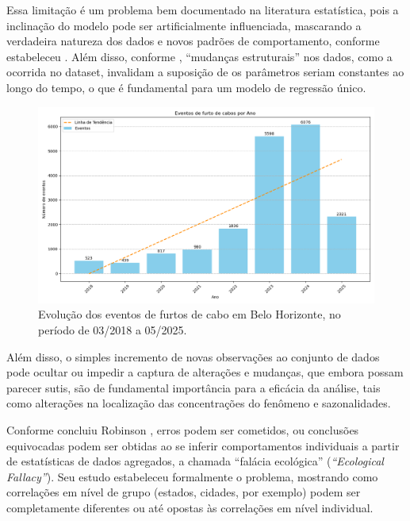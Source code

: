 Essa limitação é um problema bem documentado na literatura estatística, pois a inclinação do modelo pode ser artificialmente influenciada, mascarando a verdadeira natureza dos dados e novos padrões de comportamento, conforme estabeleceu \cite{Anscombe1973}. Além disso, conforme \cite{Gujarati2011}, ``mudanças estruturais'' nos dados, como a ocorrida no dataset, invalidam a suposição de os parâmetros seriam constantes ao longo do tempo, o que é fundamental para um modelo de regressão único.

\begin{figure}[!htb]
  \captionsetup{singlelinecheck=false}
  \centering
  \includegraphics[scale=0.5,keepaspectratio]{dados/images/grafico_barras_ocorrencias_ano.png}
  \caption{Evolução dos eventos de furtos de cabo em Belo Horizonte, no período de 03/2018 a 05/2025.}
  \label{fig:grafico_barras_ocorrencias_ano}
\end{figure}

Além disso, o simples incremento de novas observações ao conjunto de dados pode ocultar ou impedir a captura de alterações e mudanças, que embora possam parecer sutis, são de fundamental importância para a eficácia da análise, tais como alterações na localização das concentrações do fenômeno e sazonalidades. 

Conforme concluiu Robinson \cite{Robinson1950}, erros podem ser cometidos, ou conclusões equivocadas podem ser obtidas ao se inferir comportamentos individuais a partir de estatísticas de dados agregados, a chamada ``falácia ecológica'' (\textit{``Ecological Fallacy''}). Seu estudo estabeleceu formalmente o problema, mostrando como correlações em nível de grupo (estados, cidades, por exemplo) podem ser completamente diferentes ou até opostas às correlações em nível individual.

